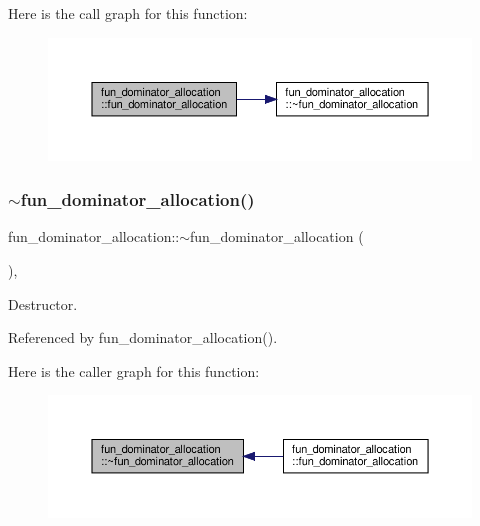 Here is the call graph for this function\+:
\nopagebreak
\begin{figure}[H]
\begin{center}
\leavevmode
\includegraphics[width=350pt]{d3/d75/classfun__dominator__allocation_a65d6cb6a0b0d37997685fa56c234ac75_cgraph}
\end{center}
\end{figure}
\mbox{\label{classfun__dominator__allocation_afd5906672613cf0531f85838a9ad9dc1}} 
\subsubsection{\texorpdfstring{$\sim$fun\+\_\+dominator\+\_\+allocation()}{~fun\_dominator\_allocation()}}
{\footnotesize\ttfamily fun\+\_\+dominator\+\_\+allocation\+::$\sim$fun\+\_\+dominator\+\_\+allocation (\begin{DoxyParamCaption}{ }\end{DoxyParamCaption})\hspace{0.3cm}{\ttfamily [override]}, {\ttfamily [default]}}



Destructor. 



Referenced by fun\+\_\+dominator\+\_\+allocation().

Here is the caller graph for this function\+:
\nopagebreak
\begin{figure}[H]
\begin{center}
\leavevmode
\includegraphics[width=350pt]{d3/d75/classfun__dominator__allocation_afd5906672613cf0531f85838a9ad9dc1_icgraph}
\end{center}
\end{figure}


